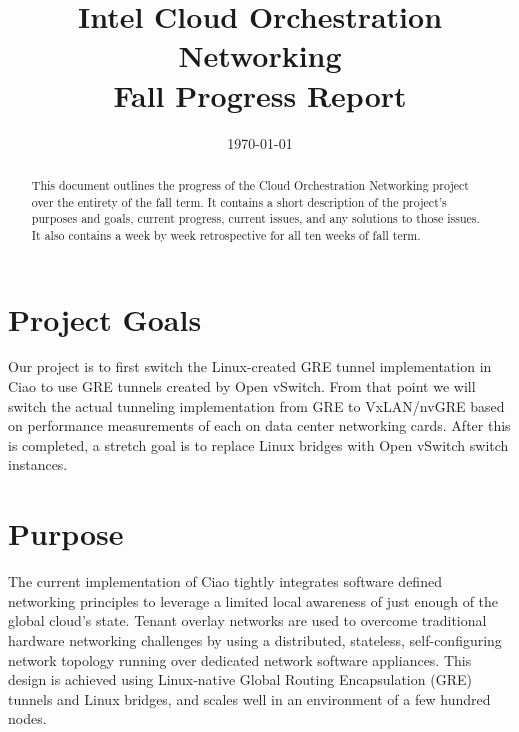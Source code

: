 \documentclass[10pt,onecolumn,journal,draftclsnofoot]{IEEEtran}
\begin{document}
\begin{titlepage}
	\title{Intel Cloud Orchestration Networking\\ Fall Progress Report}
	\date{\today}
	\maketitle
	\vspace{4cm}
	\begin{abstract}
		\noindent This document outlines the progress of the Cloud
		Orchestration Networking project over the entirety of the fall
		term. It contains a short description of the project's purposes
		and goals, current progress, current issues, and any solutions
		to those issues. It also contains a week by week retrospective
		for all ten weeks of fall term. \end{abstract}

\end{titlepage}
\tableofcontents
\clearpage

\section{Project Goals}

Our project is to first switch the Linux-created GRE tunnel implementation in
Ciao to use GRE tunnels created by Open vSwitch. From that point we will switch
the actual tunneling implementation from GRE to VxLAN/nvGRE based on performance
measurements of each on data center networking cards. After this is completed, a
stretch goal is to replace Linux bridges with Open vSwitch switch instances.

\section{Purpose}

The current implementation of Ciao tightly integrates software defined
networking principles to leverage a limited local awareness of just enough of
the global cloud's state. Tenant overlay networks are used to overcome
traditional hardware networking challenges by using a distributed, stateless,
self-configuring network topology running over dedicated network software
appliances. This design is achieved using Linux-native Global Routing
Encapsulation (GRE) tunnels and Linux bridges, and scales well in an environment
of a few hundred nodes.
\end{document}
